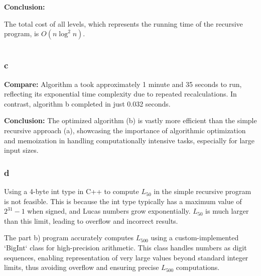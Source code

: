 \documentclass{article}
\begin{document}
\textbf{Conclusion:}

The total cost of all levels, which represents the running time of the recursive program, is \( O(n\log^2 n) \).

\section{}

\subsubsection*{c}
\textbf{Compare: }
Algorithm a took approximately 1 minute and 35 seconds to run, reflecting its exponential time complexity due to repeated recalculations. In contrast, algorithm b completed in just 0.032 seconds.

\textbf{Conclusion:}
The optimized algorithm (b) is vastly more efficient than the simple recursive approach (a), showcasing the importance of algorithmic optimization and memoization in handling computationally intensive tasks, especially for large input sizes.

\subsubsection*{d}

Using a 4-byte int type in C++ to compute \( L_{50} \) in the simple recursive program is not feasible. This is because the int type typically has a maximum value of \( 2^{31} - 1 \) when signed, and Lucas numbers grow exponentially. \( L_{50} \) is much larger than this limit, leading to overflow and incorrect results.

The part b) program accurately computes \( L_{500} \) using a custom-implemented `BigInt` class for high-precision arithmetic. This class handles numbers as digit sequences, enabling representation of very large values beyond standard integer limits, thus avoiding overflow and ensuring precise \( L_{500} \) computations.
\end{document}
